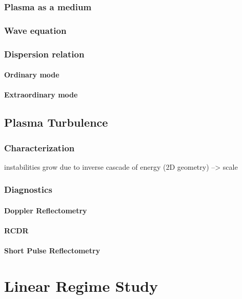 \documentclass[11pt,a4paper]{report}
\begin{document}
\begin{multicols}{2}
    \subsection{Plasma as a medium}
    \subsection{Wave equation}
    \subsection{Dispersion relation}
    \subsubsection{Ordinary mode}
    \subsubsection{Extraordinary mode}

    \section{{Plasma Turbulence}}
    \subsection{Characterization}
    instabilities grow due to inverse cascade of energy (2D geometry) --> scale
    \subsection{Diagnostics}
    \subsubsection{Doppler Reflectometry}

    \subsubsection{RCDR}

    \subsubsection{Short Pulse Reflectometry}

    \chapter{Linear Regime Study}


\end{multicols}
\end{document}
